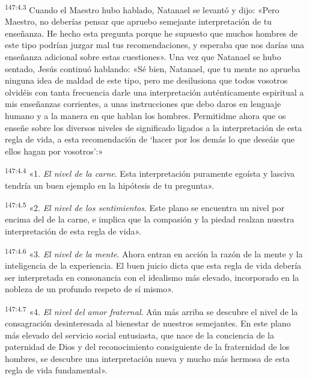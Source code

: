 \par 
\textsuperscript{147:4.3} Cuando el Maestro hubo hablado, Natanael se levantó y dijo: «Pero Maestro, no deberías pensar que apruebo semejante interpretación de tu enseñanza. He hecho esta pregunta porque he supuesto que muchos hombres de este tipo podrían juzgar mal tus recomendaciones, y esperaba que nos darías una enseñanza adicional sobre estas cuestiones». Una vez que Natanael se hubo sentado, Jesús continuó hablando: «Sé bien, Natanael, que tu mente no aprueba ninguna idea de maldad de este tipo, pero me desilusiona que todos vosotros olvidéis con tanta frecuencia darle una interpretación auténticamente espiritual a mis enseñanzas corrientes, a unas instrucciones que debo daros en lenguaje humano y a la manera en que hablan los hombres. Permitidme ahora que os enseñe sobre los diversos niveles de significado ligados a la interpretación de esta regla de vida, a esta recomendación de `hacer por los demás lo que deseáis que ellos hagan por vosotros':»

\par 
\textsuperscript{147:4.4} «1. \textit{El nivel de la carne}. Esta interpretación puramente egoísta y lasciva tendría un buen ejemplo en la hipótesis de tu pregunta».

\par 
\textsuperscript{147:4.5} «2. \textit{El nivel de los sentimientos}. Este plano se encuentra un nivel por encima del de la carne, e implica que la compasión y la piedad realzan nuestra interpretación de esta regla de vida».

\par 
\textsuperscript{147:4.6} «3. \textit{El nivel de la mente}. Ahora entran en acción la razón de la mente y la inteligencia de la experiencia. El buen juicio dicta que esta regla de vida debería ser interpretada en consonancia con el idealismo más elevado, incorporado en la nobleza de un profundo respeto de sí mismo».

\par 
\textsuperscript{147:4.7} «4. \textit{El nivel del amor fraternal}. Aún más arriba se descubre el nivel de la consagración desinteresada al bienestar de nuestros semejantes. En este plano más elevado del servicio social entusiasta, que nace de la conciencia de la paternidad de Dios y del reconocimiento consiguiente de la fraternidad de los hombres, se descubre una interpretación nueva y mucho más hermosa de esta regla de vida fundamental».

